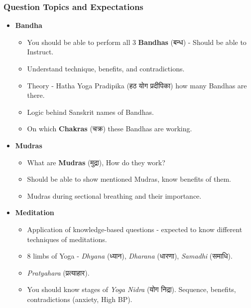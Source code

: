 \begin{frame}[fragile]\frametitle{Question Topics and Expectations}
    \begin{itemize}
        \item \textbf{Bandha}
        \begin{itemize}
            \item You should be able to perform all 3 \textbf{Bandhas} (बन्ध) - Should be able to Instruct.
            \item Understand technique, benefits, and contradictions.
            \item Theory - Hatha Yoga Pradipika (हठ योग प्रदीपिका) how many Bandhas are there.
            \item Logic behind Sanskrit names of Bandhas.
            \item On which \textbf{Chakras} (चक्र) these Bandhas are working.
        \end{itemize}
		
        \item \textbf{Mudras}
        \begin{itemize}
            \item What are \textbf{Mudras} (मुद्रा), How do they work?
            \item Should be able to show mentioned Mudras, know benefits of them.
            \item Mudras during sectional breathing and their importance.
        \end{itemize}
        
        \item \textbf{Meditation}
        \begin{itemize}
            \item Application of knowledge-based questions - expected to know different techniques of meditations.
            \item 8 limbs of Yoga - \textit{Dhyana} (ध्यान), \textit{Dharana} (धारणा), \textit{Samadhi} (समाधि).
            \item \textit{Pratyahara} (प्रत्याहार).
            \item You should know stages of \textit{Yoga Nidra} (योग निद्रा). Sequence, benefits, contradictions (anxiety, High BP).
        \end{itemize}
    \end{itemize}
\end{frame}


